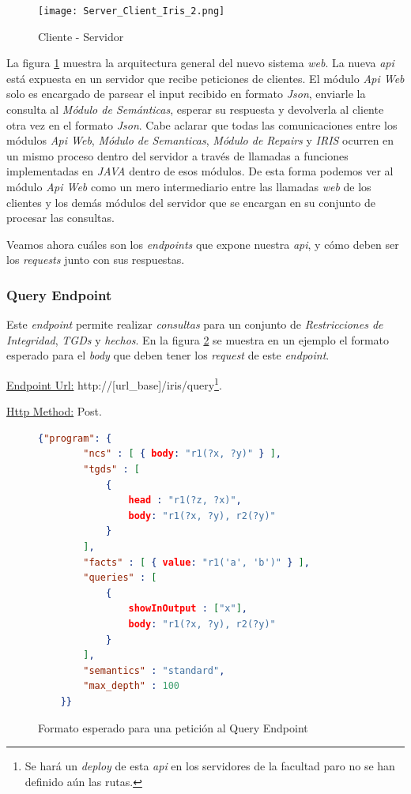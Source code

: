 \documentclass[11pt,a4paper,twoside]{tesis}
\begin{document}
\begin{figure}[ht]
    \texttt{[image: Server\_Client\_Iris\_2.png]}
    \centering
    \caption{Cliente - Servidor}
    \label{fig:server_client}
\end{figure}

La figura \ref{fig:server_client} muestra la arquitectura general del nuevo sistema \textit{web}. La nueva \textit{api} está expuesta en un servidor que recibe peticiones de clientes. El módulo \textit{Api Web} solo es encargado de parsear el input recibido en formato \textit{Json}, enviarle la consulta al \textit{Módulo de Semánticas}, esperar su respuesta y devolverla al cliente otra vez en el formato \textit{Json}. Cabe aclarar que todas las comunicaciones entre los módulos \textit{Api Web}, \textit{Módulo de Semanticas}, \textit{Módulo de Repairs} y \textit{IRIS} ocurren en un mismo proceso dentro del servidor a través de llamadas a funciones implementadas en \textit{JAVA} dentro de esos módulos. De esta forma podemos ver al módulo \textit{Api Web} como un mero intermediario entre las llamadas \textit{web} de los clientes y los demás módulos del servidor que se encargan en su conjunto de procesar las consultas.



Veamos ahora cuáles son los \textit{endpoints} que expone nuestra \textit{api}, y cómo 
deben ser los \textit{requests} junto con sus respuestas.

\subsubsection{Query Endpoint}\label{query_enpoint_section}

Este \textit{endpoint} permite realizar \textit{consultas} para un conjunto de \textit{Restricciones de Integridad}, \textit{TGDs} y \textit{hechos}. En la figura \ref{fig:query_endpoint} se muestra en un ejemplo el formato esperado para el \textit{body} que deben tener los \textit{request} de este \textit{endpoint}.

\underline{Endpoint Url:} http://[url\_base]/iris/query\footnote{Se hará un \textit{deploy} de esta \textit{api} en los servidores de la facultad paro no se han definido aún las rutas.}.

\underline{Http Method:} Post.


\begin{figure}[ht]
    \begin{lstlisting}[language=json,firstnumber=1]
    {"program": {
    	"ncs" : [ { body: "r1(?x, ?y)" } ],
        "tgds" : [
            {
            	head : "r1(?z, ?x)",
            	body: "r1(?x, ?y), r2(?y)"
            }
        ],
    	"facts" : [ { value: "r1('a', 'b')" } ],
        "queries" : [
            {
                showInOutput : ["x"],
                body: "r1(?x, ?y), r2(?y)"
            }	
        ],
    	"semantics" : "standard",
    	"max_depth" : 100
    }}
    \end{lstlisting}
    \caption{Formato esperado para una petición al Query Endpoint}
    \label{fig:query_endpoint}
\end{figure}
\end{document}

